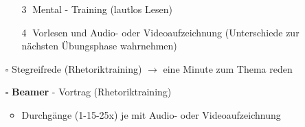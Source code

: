 \documentclass[a4paper,12pt,fleqn,parskip=half]{scrartcl}
\begin{document}
\begin{itemize}
\begin{itemize}
			\item [\textcircled{3}] Mental - Training (lautlos Lesen)
			\item [\textcircled{4}] Vorlesen und Audio- oder Videoaufzeichnung (Unterschiede zur nächsten Übungsphase wahrnehmen)
		\end{itemize}
		\item [$\square$] Stegreifrede (Rhetoriktraining) $\to$ eine Minute zum Thema reden
		\item [$\square$] \textbf{Beamer} - Vortrag (Rhetoriktraining)
		\begin{itemize} 
			\item Durchgänge (1-15-25x) je mit Audio- oder Videoaufzeichnung
		\end{itemize}
	\end{itemize}


    \printbibliography
\end{document}
